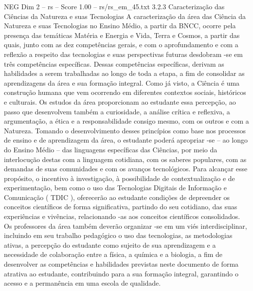 \begin{textsample}{NEG Dim 2 – rs – Score 1.00 – rs/rs\_em\_45.txt}  \label{ex:f2_neg_219}
3.2.3 Caracterização das Ciências da Natureza e suas Tecnologias A caracterização da área das Ciência da Natureza e suas Tecnologias no Ensino Médio, a partir da BNCC, ocorre pela presença das temáticas Matéria e Energia e Vida, Terra e Cosmos, a partir das quais, junto com as dez competências gerais, e com o aprofundamento e com a reflexão a respeito das tecnologias e suas perspectivas futuras desdobram -se em três competências específicas.
Dessas competências específicas, derivam as habilidades a serem trabalhadas ao longo de toda a etapa, a fim de consolidar as aprendizagens da área e sua formação integral.
Como já visto, a Ciência é uma construção humana que vem ocorrendo em diferentes contextos sociais, históricos e culturais.
Os estudos da área proporcionam ao estudante essa percepção, ao passo que desenvolvem também a curiosidade, a análise crítica e reflexiva, a argumentação, a ética e a responsabilidade consigo mesmo, com os outros e com a Natureza.
Tomando o desenvolvimento desses princípios como base nos processos de ensino e de aprendizagem da área, o estudante poderá apropriar -se – ao longo do Ensino Médio – das linguagens específicas das Ciências, por meio da interlocução destas com a linguagem cotidiana, com os saberes populares, com as demandas de suas comunidades e com os avanços tecnológicos.
Para alcançar esse propósito, o incentivo à investigação, à possibilidade de contextualização e de experimentação, bem como o uso das Tecnologias Digitais de Informação e Comunicação ( TDIC ), oferecerão ao estudante condições de depreender os conceitos científicos de forma significativa, partindo do seu cotidiano, das suas experiências e vivências, relacionando -as aos conceitos científicos consolidados.
Os professores da área também deverão organizar -se em um viés interdisciplinar, incluindo em seu trabalho pedagógico o uso das tecnologias, as metodologias ativas, a percepção do estudante como sujeito de sua aprendizagem e a necessidade de colaboração entre a física, a química e a biologia, a fim de desenvolver as competências e habilidades previstas neste documento de forma atrativa ao estudante, contribuindo para a sua formação integral, garantindo o acesso e a permanência em uma escola de qualidade.

\end{textsample}
